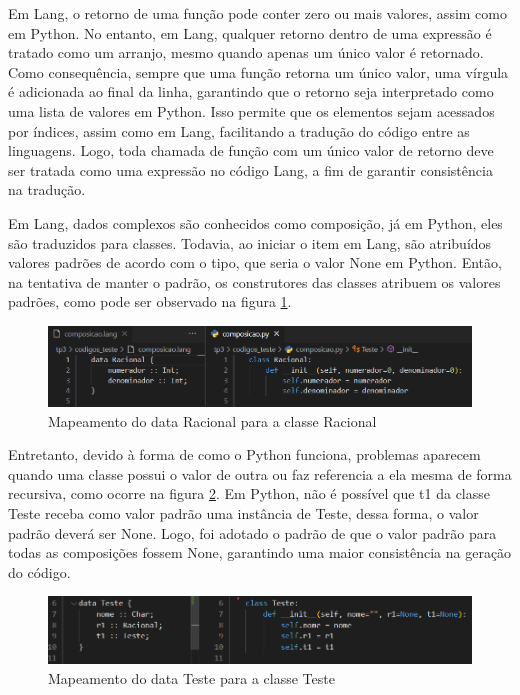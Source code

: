 \documentclass{article}
\begin{document}
    Em Lang, o retorno de uma função pode conter zero ou mais valores, assim como em Python. No entanto, em Lang, qualquer retorno dentro de uma expressão é tratado como um arranjo, mesmo quando apenas um único valor é retornado. Como consequência, sempre que uma função retorna um único valor, uma vírgula é adicionada ao final da linha, garantindo que o retorno seja interpretado como uma lista de valores em Python. Isso permite que os elementos sejam acessados por índices, assim como em Lang, facilitando a tradução do código entre as linguagens. Logo, toda chamada de função com um único valor de retorno deve ser tratada como uma expressão no código Lang, a fim de garantir consistência na tradução.

    Em Lang, dados complexos são conhecidos como composição, já em Python, eles são traduzidos para classes. Todavia, ao iniciar o item em Lang, são atribuídos valores padrões de acordo com o tipo, que seria o valor None em Python. Então, na tentativa de manter o padrão, os construtores das classes atribuem os valores padrões, como pode ser observado na figura \ref{fig:mapeamentoRacional}. 

    \begin{figure}[!htb]
        \centering
        \includegraphics[width=1.0\linewidth]{dataRacionalMapeado.png}
        \caption{Mapeamento do data Racional para a classe Racional}
        \label{fig:mapeamentoRacional}
    \end{figure}

    Entretanto, devido à forma de como o Python funciona, problemas aparecem quando uma classe possui o valor de outra ou faz referencia a ela mesma de forma recursiva, como ocorre na figura \ref{fig:mapeamentoTeste}. Em Python, não é possível que t1 da classe Teste receba como valor padrão uma instância de Teste, dessa forma, o valor padrão deverá ser None. Logo, foi adotado o padrão de que o valor padrão para todas as composições fossem None, garantindo uma maior consistência na geração do código.

    \begin{figure}[!htb]
        \centering
        \includegraphics[width=1\linewidth]{mapeamentoDoTeste.png}
        \caption{Mapeamento do data Teste para a classe Teste}
        \label{fig:mapeamentoTeste}
    \end{figure}
\end{document}
